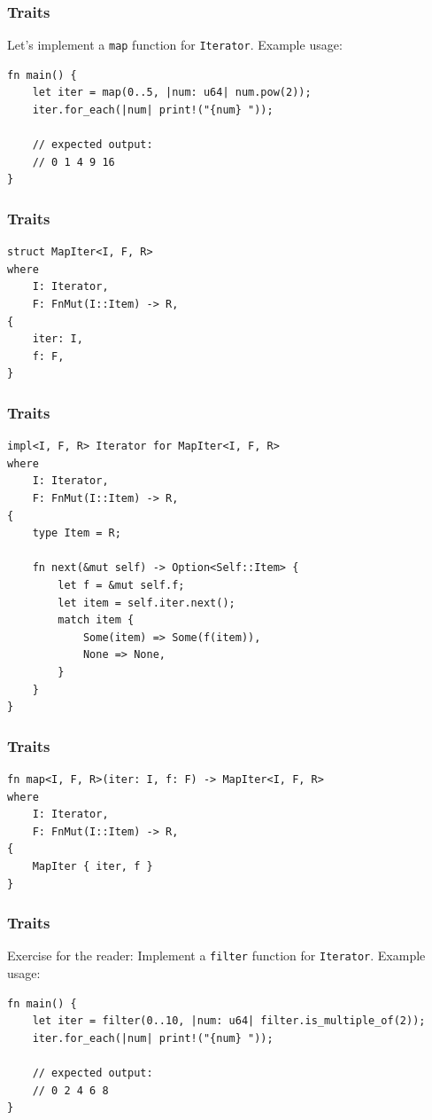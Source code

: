 \begin{frame}[fragile]
    \frametitle{Traits}
    Let's implement a \texttt{map} function for \texttt{Iterator}. Example usage:
    \vfill
    \begin{verbatim}
fn main() {
    let iter = map(0..5, |num: u64| num.pow(2));
    iter.for_each(|num| print!("{num} "));

    // expected output:
    // 0 1 4 9 16
}
    \end{verbatim}
\end{frame}

\begin{frame}[fragile]
    \frametitle{Traits}
    \begin{verbatim}
struct MapIter<I, F, R>
where
    I: Iterator,
    F: FnMut(I::Item) -> R,
{
    iter: I,
    f: F,
}
    \end{verbatim}
\end{frame}

\begin{frame}[fragile]
    \frametitle{Traits}
    \begin{verbatim}
impl<I, F, R> Iterator for MapIter<I, F, R>
where
    I: Iterator,
    F: FnMut(I::Item) -> R,
{
    type Item = R;

    fn next(&mut self) -> Option<Self::Item> {
        let f = &mut self.f;
        let item = self.iter.next();
        match item {
            Some(item) => Some(f(item)),
            None => None,
        }
    }
}
    \end{verbatim}
\end{frame}

\begin{frame}[fragile]
    \frametitle{Traits}
    \begin{verbatim}
fn map<I, F, R>(iter: I, f: F) -> MapIter<I, F, R>
where
    I: Iterator,
    F: FnMut(I::Item) -> R,
{
    MapIter { iter, f }
}
    \end{verbatim}
\end{frame}

\begin{frame}[fragile]
    \frametitle{Traits}
    Exercise for the reader: Implement a \texttt{filter} function for \texttt{Iterator}. Example usage:
    \vfill
    \begin{verbatim}
fn main() {
    let iter = filter(0..10, |num: u64| filter.is_multiple_of(2));
    iter.for_each(|num| print!("{num} "));

    // expected output:
    // 0 2 4 6 8
}
    \end{verbatim}
\end{frame}

